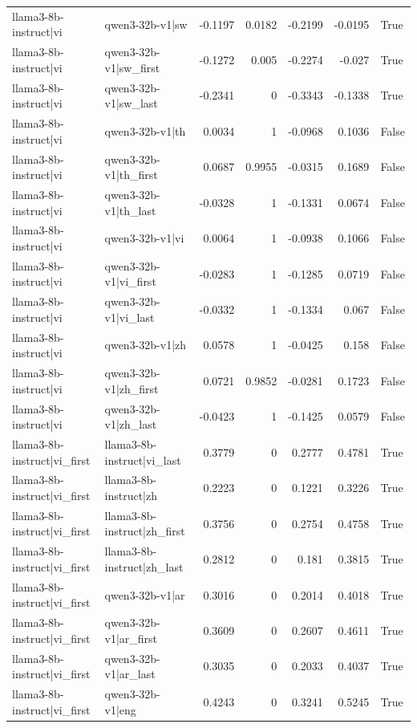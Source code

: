 \begin{table}
\begin{tabular}{l l r r r r l}
llama3-8b-instruct|vi & qwen3-32b-v1|sw & -0.1197 & 0.0182 & -0.2199 & -0.0195 & True \\
llama3-8b-instruct|vi & qwen3-32b-v1|sw_first & -0.1272 & 0.005 & -0.2274 & -0.027 & True \\
llama3-8b-instruct|vi & qwen3-32b-v1|sw_last & -0.2341 & 0 & -0.3343 & -0.1338 & True \\
llama3-8b-instruct|vi & qwen3-32b-v1|th & 0.0034 & 1 & -0.0968 & 0.1036 & False \\
llama3-8b-instruct|vi & qwen3-32b-v1|th_first & 0.0687 & 0.9955 & -0.0315 & 0.1689 & False \\
llama3-8b-instruct|vi & qwen3-32b-v1|th_last & -0.0328 & 1 & -0.1331 & 0.0674 & False \\
llama3-8b-instruct|vi & qwen3-32b-v1|vi & 0.0064 & 1 & -0.0938 & 0.1066 & False \\
llama3-8b-instruct|vi & qwen3-32b-v1|vi_first & -0.0283 & 1 & -0.1285 & 0.0719 & False \\
llama3-8b-instruct|vi & qwen3-32b-v1|vi_last & -0.0332 & 1 & -0.1334 & 0.067 & False \\
llama3-8b-instruct|vi & qwen3-32b-v1|zh & 0.0578 & 1 & -0.0425 & 0.158 & False \\
llama3-8b-instruct|vi & qwen3-32b-v1|zh_first & 0.0721 & 0.9852 & -0.0281 & 0.1723 & False \\
llama3-8b-instruct|vi & qwen3-32b-v1|zh_last & -0.0423 & 1 & -0.1425 & 0.0579 & False \\
llama3-8b-instruct|vi_first & llama3-8b-instruct|vi_last & 0.3779 & 0 & 0.2777 & 0.4781 & True \\
llama3-8b-instruct|vi_first & llama3-8b-instruct|zh & 0.2223 & 0 & 0.1221 & 0.3226 & True \\
llama3-8b-instruct|vi_first & llama3-8b-instruct|zh_first & 0.3756 & 0 & 0.2754 & 0.4758 & True \\
llama3-8b-instruct|vi_first & llama3-8b-instruct|zh_last & 0.2812 & 0 & 0.181 & 0.3815 & True \\
llama3-8b-instruct|vi_first & qwen3-32b-v1|ar & 0.3016 & 0 & 0.2014 & 0.4018 & True \\
llama3-8b-instruct|vi_first & qwen3-32b-v1|ar_first & 0.3609 & 0 & 0.2607 & 0.4611 & True \\
llama3-8b-instruct|vi_first & qwen3-32b-v1|ar_last & 0.3035 & 0 & 0.2033 & 0.4037 & True \\
llama3-8b-instruct|vi_first & qwen3-32b-v1|eng & 0.4243 & 0 & 0.3241 & 0.5245 & True \\

\end{tabular}
\end{table}
